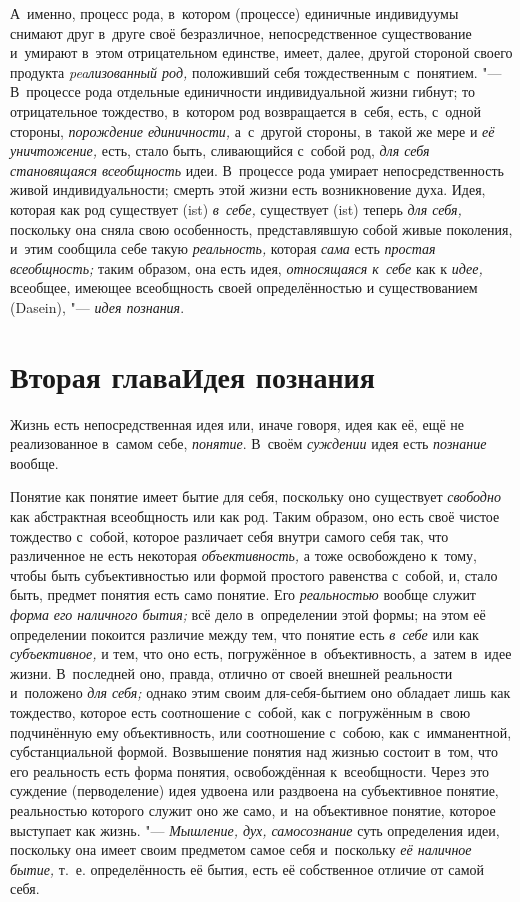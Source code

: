 А~именно, процесс рода, в~котором (процессе) единичные
индивидуумы снимают друг в~друге своё безразличное, непосредственное
существование и~умирают в~этом отрицательном единстве, имеет, далее, другой
стороной своего продукта {\em peaлизованный род,}
положивший себя тождественным с~понятием. "--- В~процессе рода
отдельные единичности индивидуальной жизни гибнут; то
отрицательное тождество, в~котором род возвращается в~себя, есть, с~одной
стороны, {\em порождение единичности,}
а~с~другой стороны, в~такой же мере и {\em её уничтожение,}
есть, стало быть, сливающийся с~собой род,
{\em для себя становящаяся всеобщность}
идеи. В~процессе рода умирает непосредственность живой
индивидуальности; смерть этой жизни есть возникновение духа. Идея, которая
как род существует (ist) {\em в~себе,}
существует (ist) теперь {\em для себя,} поскольку
она сняла свою особенность, представлявшую собой живые поколения, и~этим
сообщила себе такую {\em реальность,} которая {\em сама}
есть {\em простая всеобщность;} таким образом, она есть идея,
{\em относящаяся к~себе} как к {\em идее,}
всеобщее, имеющее всеобщность своей определённостью и
существованием (Dasein), "--- {\em идея познания}.

\chapter[Вторая глава Идея познания]{Вторая глава\newline Идея познания}

Жизнь есть непосредственная идея или, иначе говоря, идея как
её, ещё не реализованное в~самом себе, {\em понятие}. В~своём
{\em суждении} идея есть {\em познание} вообще.

Понятие как понятие имеет бытие для себя, поскольку оно
существует {\em свободно}
как абстрактная всеобщность или как род. Таким образом, оно
есть своё чистое тождество с~собой, которое различает себя внутри самого
себя так, что различенное не есть некоторая {\em объективность,} а
тоже освобождено к~тому, чтобы быть субъективностью или формой простого
равенства с~собой, и, стало быть, предмет понятия есть само понятие. Его
{\em реальностью} вообще служит {\em форма} {\em его наличного бытия;}
всё дело в~определении этой формы; на этом её определении
покоится различие между тем, что понятие есть
{\em в~себе} или как {\em субъективное,} и
тем, что оно есть, погружённое в~объективность, а~затем в~идее жизни.
В~последней оно, правда, отлично от своей внешней реальности и~положено
{\em для себя;} однако
этим своим для-себя-бытием оно обладает лишь как тождество, которое есть
соотношение с~собой, как с~погружённым в~свою подчинённую ему
объективность, или соотношение с~собою, как с~имманентной, субстанциальной
формой. Возвышение понятия над жизнью состоит в~том, что его реальность
есть форма понятия, освобождённая к~всеобщности. Через это суждение
(перводеление) идея удвоена или раздвоена на субъективное понятие,
реальностью которого служит оно же само, и~на объективное понятие, которое
выступает как жизнь. "--- {\em Мышление,
дух, самосознание} суть определения идеи, поскольку она
имеет своим предметом самое себя и~поскольку
{\em её наличное бытие,}
т.~е. определённость её бытия, есть её собственное отличие от
самой себя.

